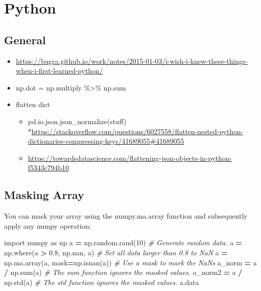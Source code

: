 \documentclass[]{book}
\newenvironment{Shaded}{\begin{snugshade}}{\end{snugshade}}
\newcommand{\DecValTok}[1]{\textcolor[rgb]{0.00,0.00,0.81}{#1}}
\newcommand{\FloatTok}[1]{\textcolor[rgb]{0.00,0.00,0.81}{#1}}
\newcommand{\ImportTok}[1]{#1}
\newcommand{\CommentTok}[1]{\textcolor[rgb]{0.56,0.35,0.01}{\textit{#1}}}
\newcommand{\OperatorTok}[1]{\textcolor[rgb]{0.81,0.36,0.00}{\textbf{#1}}}
\newcommand{\BuiltInTok}[1]{#1}
\newcommand{\NormalTok}[1]{#1}
\providecommand{\tightlist}{%
  \setlength{\itemsep}{0pt}\setlength{\parskip}{0pt}}
\theoremstyle{definition}
\theoremstyle{definition}
\theoremstyle{definition}
\theoremstyle{remark}
\begin{document}
\section{Python}\label{python}

\subsection{General}\label{general-5}

\begin{itemize}
\item
  \url{https://bugra.github.io/work/notes/2015-01-03/i-wish-i-knew-these-things-when-i-first-learned-python/}
\item
  np.dot = np.multiply \%\textgreater{}\% np.sum
\item
  flatten dict

  \begin{itemize}
  \tightlist
  \item
    pd.io.json.json\_normalize(stuff)
    *\url{https://stackoverflow.com/questions/6027558/flatten-nested-python-dictionaries-compressing-keys/41689055\#41689055}
  \item
    \url{https://towardsdatascience.com/flattening-json-objects-in-python-f5343c794b10}
  \end{itemize}
\end{itemize}

\subsection{Masking Array}\label{masking-array}

You can mask your array using the numpy.ma.array function and
subsequently apply any numpy operation:

\begin{Shaded}
\begin{Highlighting}[]
\ImportTok{import}\NormalTok{ numpy }\ImportTok{as}\NormalTok{ np}
\NormalTok{a }\OperatorTok{=}\NormalTok{ np.random.rand(}\DecValTok{10}\NormalTok{)            }\CommentTok{# Generate random data.}
\NormalTok{a }\OperatorTok{=}\NormalTok{ np.where(a }\OperatorTok{>} \FloatTok{0.8}\NormalTok{, np.nan, a)  }\CommentTok{# Set all data larger than 0.8 to NaN}
\NormalTok{a }\OperatorTok{=}\NormalTok{ np.ma.array(a, mask}\OperatorTok{=}\NormalTok{np.isnan(a)) }\CommentTok{# Use a mask to mark the NaNs}
\NormalTok{a_norm  }\OperatorTok{=}\NormalTok{ a }\OperatorTok{/}\NormalTok{ np.}\BuiltInTok{sum}\NormalTok{(a) }\CommentTok{# The sum function ignores the masked values.}
\NormalTok{a_norm2 }\OperatorTok{=}\NormalTok{ a }\OperatorTok{/}\NormalTok{ np.std(a) }\CommentTok{# The std function ignores the masked values.}
\NormalTok{a.data}
\end{Highlighting}
\end{Shaded}
\end{document}
